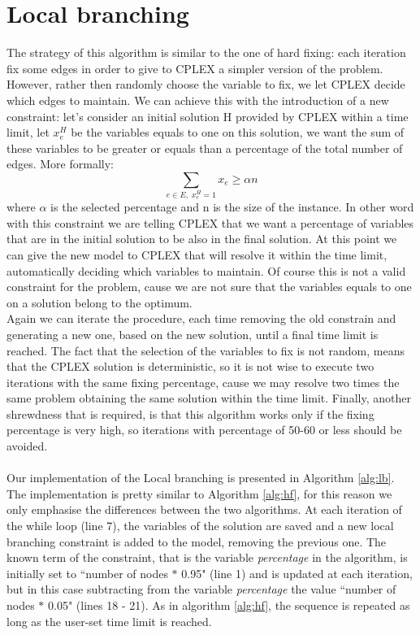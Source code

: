 \section{Local branching}
The strategy of this algorithm \cite{LB} is similar to the one of hard fixing: each iteration fix some edges in order to give to CPLEX a simpler version of the problem. However, rather then randomly choose the variable to fix, we let CPLEX decide which edges to maintain. We can achieve this with the introduction of a new constraint: let's consider an initial solution H provided by CPLEX within a time limit, let $x_e^H$ be the variables equals to one on this solution, we want the sum of these variables to be greater or equals than a percentage of the total number of edges. More formally:
\begin{equation*}
	\sum_{e \in E, \; x_e^H = 1} x_e \geq \alpha n
\end{equation*}
where $\alpha$ is the selected percentage and n is the size of the instance. In other word with this constraint we are telling CPLEX that we want a percentage of variables that are in the initial solution to be also in the final solution. At this point we can give the new model to CPLEX that will resolve it within the time limit, automatically deciding which variables to maintain.
Of course this is not a valid constraint for the problem, cause we are not sure that the variables equals to one on a solution belong to the optimum.\\
Again we can iterate the procedure, each time removing the old constrain and generating a new one, based on the new solution, until a final time limit is reached. The fact that the selection of the variables to fix is not random, means that the CPLEX solution is deterministic, so it is not wise to execute two iterations with the same fixing percentage, cause we may resolve two times the same problem obtaining the same solution within the time limit.
Finally, another shrewdness that is required, is that this algorithm works only if the fixing percentage is very high, so iterations with percentage of 50-60 or less should be avoided. 
\\\\ Our implementation of the Local branching is presented in Algorithm \ref{alg:lb}. The implementation is pretty similar to Algorithm \ref{alg:hf}, for this reason we only emphasise the differences between the two algorithms. 
At each iteration of the while loop (line 7), the variables of the solution are saved and a new local branching constraint is added to the model, removing the previous one. The known term of the constraint, that is the variable \textit{percentage} in the algorithm, is initially set to ``number of nodes $\ast$ 0.95" (line 1) and is updated at each iteration, but in this case subtracting from the variable \textit{percentage} the value ``number of nodes $\ast$ 0.05" (lines 18 - 21). As in algorithm \ref{alg:hf}, the sequence is repeated as long as the user-set time limit is reached.

